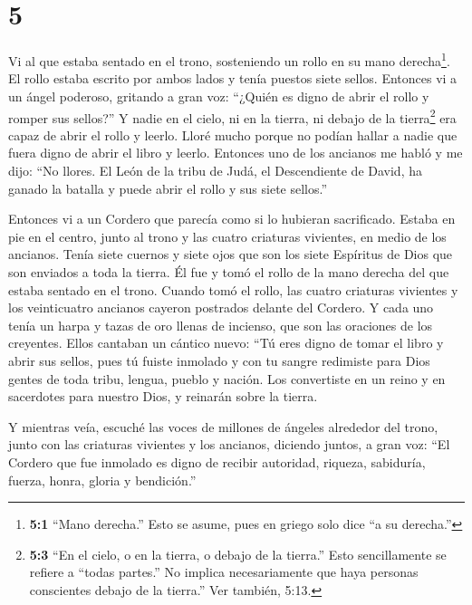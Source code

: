 \hypertarget{section-4}{%
\section{5}\label{section-4}}

 Vi al que estaba sentado en el trono, sosteniendo un rollo
en su mano derecha\footnote{\textbf{5:1} ``Mano derecha.'' Esto se
  asume, pues en griego solo dice ``a su derecha.''}. El rollo estaba
escrito por ambos lados y tenía puestos siete sellos. 
Entonces vi a un ángel poderoso, gritando a gran voz: ``¿Quién es digno
de abrir el rollo y romper sus sellos?''  Y nadie en el
cielo, ni en la tierra, ni debajo de la tierra\footnote{\textbf{5:3}
  ``En el cielo, o en la tierra, o debajo de la tierra.'' Esto
  sencillamente se refiere a ``todas partes.'' No implica necesariamente
  que haya personas conscientes debajo de la tierra.'' Ver también,
  5:13.} era capaz de abrir el rollo y leerlo.  Lloré mucho
porque no podían hallar a nadie que fuera digno de abrir el libro y
leerlo.  Entonces uno de los ancianos me habló y me dijo:
``No llores. El León de la tribu de Judá, el Descendiente de David, ha
ganado la batalla y puede abrir el rollo y sus siete sellos.''

 Entonces vi a un Cordero que parecía como si lo hubieran
sacrificado. Estaba en pie en el centro, junto al trono y las cuatro
criaturas vivientes, en medio de los ancianos. Tenía siete cuernos y
siete ojos que son los siete Espíritus de Dios que son enviados a toda
la tierra.  Él fue y tomó el rollo de la mano derecha del
que estaba sentado en el trono.  Cuando tomó el rollo, las
cuatro criaturas vivientes y los veinticuatro ancianos cayeron postrados
delante del Cordero. Y cada uno tenía un harpa y tazas de oro llenas de
incienso, que son las oraciones de los creyentes.  Ellos
cantaban un cántico nuevo: ``Tú eres digno de tomar el libro y abrir sus
sellos, pues tú fuiste inmolado y con tu sangre redimiste para Dios
gentes de toda tribu, lengua, pueblo y nación.  Los
convertiste en un reino y en sacerdotes para nuestro Dios, y reinarán
sobre la tierra.

 Y mientras veía, escuché las voces de millones de ángeles
alrededor del trono, junto con las criaturas vivientes y los ancianos,
 diciendo juntos, a gran voz: ``El Cordero que fue inmolado
es digno de recibir autoridad, riqueza, sabiduría, fuerza, honra, gloria
y bendición.''

